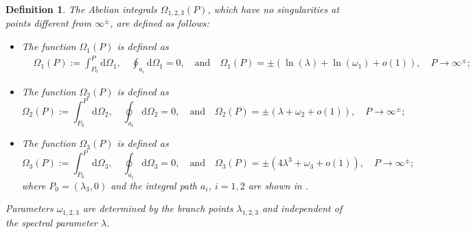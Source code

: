 \documentclass[11pt,reqno]{amsart}
\newcommand{\dd}{\mathrm{d}}
\newtheorem{define}{Definition}
\numberwithin{equation}{section}
\begin{document}
\begin{define}
	The Abelian integrals $\Omega_{1,2,3}(P)$, which have no singularities at points different from $\infty^{\pm}$, are defined as follows:
	\begin{itemize}
		\item The function $\Omega_1(P)$ is defined as
		\begin{equation}\label{eq:define-int-w1}
			\begin{split}
				&\Omega_1(P):=\int_{P_0}^{P} \dd\Omega_1, 
				\quad
				\oint_{a_i} \dd \Omega_1=0,
				\quad
				\text{and} \quad \Omega_1(P)=\pm(\ln(\lambda) 
				+ \ln(\omega_1)+o(1)), \quad  P\rightarrow \infty^{\pm}; 
			\end{split}
		\end{equation}
		\item The function $\Omega_2(P)$ is defined as 
		\begin{equation}\label{eq:define-int-w2}
			\Omega_2(P):=\int_{P_0}^{P}\dd\Omega_2, 
			\quad 	
			\oint_{a_i}\dd\Omega_2=0,  \quad
			\text{and} \quad
			\Omega_2(P)=\pm(\lambda
			+ \omega_2+o(1)), \quad  P\rightarrow \infty^{\pm}; 
		\end{equation}
		\item The function $\Omega_3(P)$ is defined as 
		\begin{equation}\label{eq:define-int-w3}
			\Omega_3(P):=\int_{P_0}^{P} \dd\Omega_3, \quad 
			\oint_{a_i}\dd \Omega_3=0, \quad 
			\text{and} \quad	
			\Omega_3(P)=\pm (4\lambda^3
			+ \omega_3+o(1)), 
			\quad 
			P\rightarrow \infty^{\pm};		
		\end{equation}
		where $P_0=(\lambda_3,0)$ and the integral path $a_i$, $i=1,2$ are shown in .	
	\end{itemize}
	Parameters $\omega_{1,2,3}$ are determined by the branch points $\lambda_{1,2,3}$ and independent of the spectral parameter $\lambda$.
\end{define}
\end{document}
